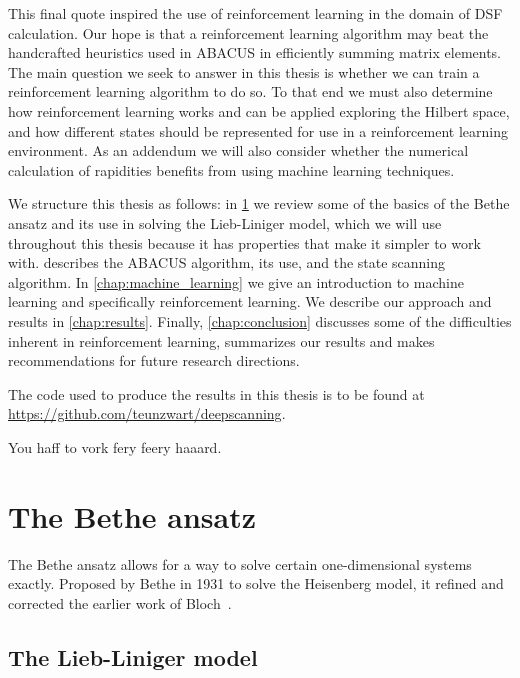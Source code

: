 \documentclass[11pt, a4paper]{report} %
\begin{document}
This final quote inspired the use of reinforcement learning in the domain of DSF calculation.
Our hope is that a reinforcement learning algorithm may beat the handcrafted heuristics used in ABACUS in efficiently summing matrix elements.
The main question we seek to answer in this thesis is whether we can train a reinforcement learning algorithm to do so.
To that end we must also determine how reinforcement learning works and can be applied exploring the Hilbert space, and how different states should be represented for use in a reinforcement learning environment.
As an addendum we will also consider whether the numerical calculation of rapidities benefits from using machine learning techniques.

We structure this thesis as follows:
in \cref{chap:bethe_ansatz} we review some of the basics of the Bethe ansatz and its use in solving the Lieb-Liniger model, which we will use throughout this thesis because it has properties that make it simpler to work with.
 describes the ABACUS algorithm, its use, and the state scanning algorithm.
In \cref{chap:machine_learning} we give an introduction to machine learning and specifically reinforcement learning.
We describe our approach and results in \cref{chap:results}.
Finally, \cref{chap:conclusion} discusses some of the difficulties inherent in reinforcement learning, summarizes our results and makes recommendations for future research directions.

\begin{sloppypar}
The code used to produce the results in this thesis is to be found at \href{https://github.com/teunzwart/deepscanning}{https://github.com/teunzwart/deepscanning}.
\end{sloppypar}

\begin{savequote}[50mm]
You haff to vork fery feery haaard.
\end{savequote}

\chapter{The Bethe ansatz}\label{chap:bethe_ansatz}


\noindent
The Bethe ansatz allows for a way to solve certain one-dimensional systems exactly.
Proposed by Bethe in 1931 to solve the Heisenberg model, it refined and corrected the earlier work of Bloch~\cite{Bethe1931}.

\section{The Lieb-Liniger model}
\end{document}
